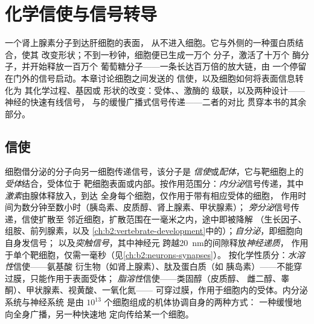  \chapter{化学信使与信号转导}\label{ch:b2:cell-signalling}

一个肾上腺素分子到达肝细胞的表面，
从不进入细胞。它与外侧的一种蛋白质结合，使其
改变形状；不到一秒钟，细胞便已生成一万个
分子，激活了十万个
酶分子，并开始释放一百万个
葡萄糖分子——一条长达百万倍的放大链，由
一个停留在门外的信号启动。本章讨论细胞之间发送的
信使，以及细胞如何将表面信息转化为
其化学过程、基因或
形状的改变：受体、、激酶的
级联，以及两种设计——神经的快速有线信号，
与的缓慢广播式信号传递——二者的对比
贯穿本书的其余部分。

\section{信使}

\begin{definition}[化学信号传递的类型]\label{def:b2:cell-signalling:kinds}
细胞借分泌的分子向另一细胞传递信号，该分子是
\emph{信使}或\emph{配体}，它与靶细胞上的\emph{受体}结合，受体位于
靶细胞表面或内部。按作用范围分：\emph{内分泌}信号传递，其中
\emph{激素}由腺体释放入，到达
全身每个细胞，仅作用于带有相应受体的细胞，
作用时间为数分钟至数小时（胰岛素、皮质醇、肾上腺素、甲状腺素）；
\emph{旁分泌}信号传递，信使扩散至
邻近细胞，扩散范围在一毫米之内，途中即被降解
（生长因子、组胺、前列腺素，以及
\cref{ch:b2:vertebrate-development}中的）；\emph{自分泌}，即细胞向自身发信号；
以及\emph{突触信号}，其中神经元
跨越\qty{20}{nm}的间隙释放\emph{神经递质}，
作用于单个靶细胞，仅需一毫秒（见\cref{ch:b2:neurons-synapses}）。
按化学性质分：\emph{水溶性}信使——氨基酸
衍生物（如肾上腺素）、肽及蛋白质（如
胰岛素）——不能穿过膜，只能作用于表面受体；
\emph{脂溶性}信使——类固醇（皮质醇、
雌二醇、睾酮）、甲状腺素、视黄酸、一氧化氮——
可穿过膜，作用于细胞内的受体。内分泌系统与神经系统
是由 $10^{13}$ 个细胞组成的机体协调自身的两种方式：
一种缓慢地向全身广播，另一种快速地
定向传给某一个细胞。
\end{definition}

